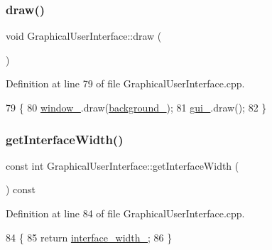 \mbox{\label{classGraphicalUserInterface_a268c54faf6a8ac32628c60495900ea1c}} 
\subsubsection{\texorpdfstring{draw()}{draw()}}
{\footnotesize\ttfamily void Graphical\+User\+Interface\+::draw (\begin{DoxyParamCaption}{ }\end{DoxyParamCaption})}



Definition at line 79 of file Graphical\+User\+Interface.\+cpp.


\begin{DoxyCode}
79                                   \{
80     \hyperlink{classGraphicalUserInterface_ae51adeb759a97196eda3b37bfc80a452}{window\_}.draw(\hyperlink{classGraphicalUserInterface_a6d706ef82ec59d143a009331b40681bb}{background\_});
81     \hyperlink{classGraphicalUserInterface_ab07abda0fdb8e2965b70d2024fa3cf20}{gui\_}.draw();
82 \}
\end{DoxyCode}
\mbox{\label{classGraphicalUserInterface_a6b168726ffb57ba7d06946d27435abad}} 
\subsubsection{\texorpdfstring{get\+Interface\+Width()}{getInterfaceWidth()}}
{\footnotesize\ttfamily const int Graphical\+User\+Interface\+::get\+Interface\+Width (\begin{DoxyParamCaption}{ }\end{DoxyParamCaption}) const}



Definition at line 84 of file Graphical\+User\+Interface.\+cpp.


\begin{DoxyCode}
84                                                           \{
85     \textcolor{keywordflow}{return} \hyperlink{classGraphicalUserInterface_ae3c07ea59e557909f92882028fafb0a3}{interface\_width\_};
86 \}
\end{DoxyCode}
\mbox{\label{classGraphicalUserInterface_a71964c3c49b23a05aa3fd4b4d36aa42d}} 
